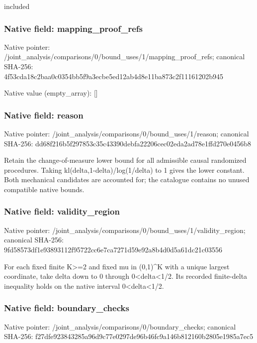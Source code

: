 \documentclass[10pt,a4paper]{article}
\begin{document}
\begingroup\raggedright\sloppy included\par\endgroup

\subsubsection{Native field: mapping\_\allowbreak{}proof\_\allowbreak{}refs}
Native pointer: /joint\_\allowbreak{}analysis/comparisons/0/bound\_\allowbreak{}uses/1/mapping\_\allowbreak{}proof\_\allowbreak{}refs; canonical SHA-256: 4f53cda18c2baa0c0354bb5f9a3ecbe5ed12ab4d8e11ba873c2f11161202b945

Native value (empty\_\allowbreak{}array): []

\subsubsection{Native field: reason}
Native pointer: /joint\_\allowbreak{}analysis/comparisons/0/bound\_\allowbreak{}uses/1/reason; canonical SHA-256: dd68f216b5f297853c35c43390debfa22206cec02eda2ad78e1ffd270e0456b8

\begingroup\raggedright\sloppy Retain the change-of-measure lower bound for all admissible causal randomized procedures. Taking kl(delta,\allowbreak{}1-delta)/\allowbreak{}log(1/\allowbreak{}delta) to 1 gives the lower constant. Both mechanical candidates are accounted for;\allowbreak{} the catalogue contains no unused compatible native bounds.\par\endgroup

\subsubsection{Native field: validity\_\allowbreak{}region}
Native pointer: /joint\_\allowbreak{}analysis/comparisons/0/bound\_\allowbreak{}uses/1/validity\_\allowbreak{}region; canonical SHA-256: 9fd58573df1e93893112f95722cc6e7ca7271d59e92a8b4d0d5a61dc21c03556

\begingroup\raggedright\sloppy For each fixed finite K>=\allowbreak{}2 and fixed mu in (0,\allowbreak{}1)\textasciicircum{}K with a unique largest coordinate,\allowbreak{} take delta down to 0 through 0<delta<1/\allowbreak{}2. Its recorded finite-delta inequality holds on the native interval 0<delta<1/\allowbreak{}2.\par\endgroup

\subsubsection{Native field: boundary\_\allowbreak{}checks}
Native pointer: /joint\_\allowbreak{}analysis/comparisons/0/boundary\_\allowbreak{}checks; canonical SHA-256: f27dfe923843285a96d9c77e0297de96b46fc9a146b812160b2805e1985a7ec5
\end{document}
